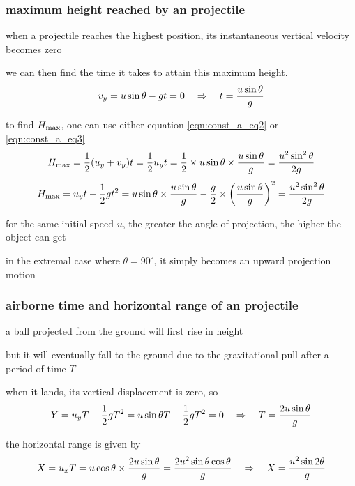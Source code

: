 \subsubsection*{maximum height reached by an projectile}

when a projectile reaches the highest position, its instantaneous vertical velocity becomes zero

we can then find the time it takes to attain this maximum height.
\begin{equation*}
	v_y = u\sin\theta - gt = 0 \quad \Rightarrow \quad t = \frac{u\sin\theta}{g}
\end{equation*}
	
to find $H_{\text{max}}$, one can use either equation \eqref{eqn:const_a_eq2} or \eqref{eqn:const_a_eq3} 
	\begin{equation*}
	H_{\text{max}} = \frac{1}{2}(u_y+v_y) t = \frac{1}{2}u_y t = \frac{1}{2} \times u \sin\theta \times \frac{u\sin\theta}{g} = \frac{u^2 \sin^2\theta}{2g}
	\end{equation*}
	\begin{equation*}
	H_{\text{max}} = u_y t - \frac{1}{2}gt^2 = u \sin\theta \times \frac{u\sin\theta}{g} - \frac{g}{2} \times \left(\frac{u\sin\theta}{g}\right)^2 = \frac{u^2 \sin^2\theta}{2g}
	\end{equation*}

\cmt for the same initial speed $u$, the greater the angle of projection, the higher the object can get

in the extremal case where $\theta = 90 ^\circ$, it simply becomes an upward projection motion

\subsubsection*{airborne time and horizontal range of an projectile}

a ball projected from the ground will first rise in height

but it will eventually fall to the ground due to the gravitational pull after a period of time $T$

when it lands, its vertical displacement is zero, so
	\begin{equation*}
	Y = u_y T - \frac{1}{2}gT^2 = u \sin \theta T - \frac{1}{2}gT^2 = 0 \quad \Rightarrow \quad T = \frac{2u\sin\theta}{g}
	\end{equation*}
	
the horizontal range is given by
	\begin{equation*}
	X = u_x T = u\cos\theta \times \frac{2u\sin\theta}{g} = \frac{2u^2\sin\theta\cos\theta}{g} \quad \Rightarrow \quad X = \frac{u^2\sin2\theta}{g}
	\end{equation*}
	
